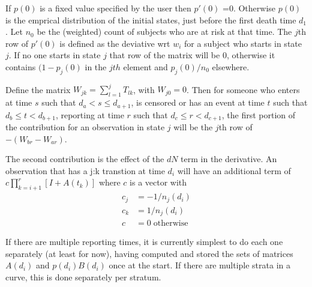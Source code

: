 \documentclass{article}
\begin{document}
If $p(0)$ is a fixed value specified by the user then $p'(0)$ =0.
Otherwise $p(0)$ is the emprical distribution of the initial states, just
before the first death time $d_1$.  Let $n_0$ be the (weighted) count of 
subjects who are at risk at that time.  
The $j$th row of $p'(0)$ is defined as the deviative wrt $w_i$ for a subject
who starts in state $j$.  
If no one starts in state $j$ that row of the matrix will be 0, otherwise
it contains $(1-p_j(0)$ in the $jth$ element and $p_j(0)/n_0$ elsewhere.

Define the matrix $W_{jk} = \sum_{l=1}^j T_{lk}$, with $W_{j0}=0$.
Then for someone who enters at time $s$ such that $d_a < s \le d_{a+1}$,
is censored or has an event at time $t$ such that $d_b \le t <d_{b+1}$,
reporting at time $r$ such that $d_c \le r < d_{c+1}$, the first portion of
the contribution for an observation in state $j$ will be the 
$j$th row of $- (W_{br}-W_{ar})$. 

The second contribution is the effect of the $dN$ term in the derivative.
An observation that has a j:k transtion at time $d_i$ will have an
additional term of $c \prod_{k=i+1}^r [I + A(t_k)]$ where $c$ is a vector
with 
\begin{align*}
  c_j &= -1/n_j(d_i) \\
  c_k &=  1/n_j(d_i) \\
  c   &=  0 \;\mbox{otherwise}
\end{align*}

If there are multiple reporting times, it is currently simplest to do each
one separately (at least for now), having computed and stored the sets of
matrices $A(d_i)$ and $p(d_i)B(d_i)$ once at the start.
If there are multiple strata in a curve, this is done separately per stratum.
\end{document}
